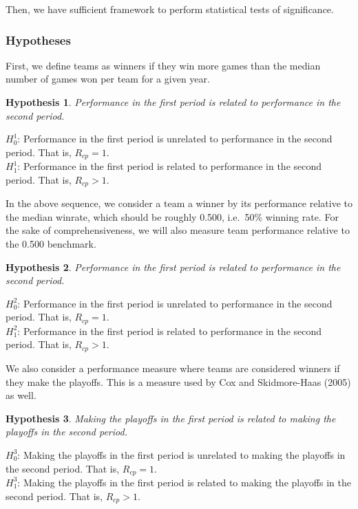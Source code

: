 \documentclass[11pt,]{scrartcl}
\newtheorem{hypothesis}{Hypothesis}
\begin{document}
Then, we have sufficient framework to perform statistical tests of
significance.

\subsubsection{Hypotheses}\label{hypotheses}

First, we define teams as winners if they win more games than the median
number of games won per team for a given year.

\begin{framed}
\begin{hypothesis}
Performance in the first period is related to performance in the second period. 
\end{hypothesis}

\noindent $H_{0}^1$: Performance in the first period is unrelated to performance in the second period. That is, $R_{cp} = 1$. \\ 
$H_{1}^1$: Performance in the first period is related to performance in the second period. That is, $R_{cp} > 1$. 
\end{framed}

In the above sequence, we consider a team a winner by its performance
relative to the median winrate, which should be roughly 0.500, i.e.~50\%
winning rate. For the sake of comprehensiveness, we will also measure
team performance relative to the 0.500 benchmark.

\begin{framed}
\begin{hypothesis}
Performance in the first period is related to performance in the second period.
\end{hypothesis}

\noindent $H_{0}^2$: Performance in the first period is unrelated to performance in the second period. That is, $R_{cp} = 1$.  \\
$H_{1}^2$: Performance in the first period is related to performance in the second period. That is, $R_{cp} > 1$. 
\end{framed}

We also consider a performance measure where teams are considered
winners if they make the playoffs. This is a measure used by Cox and
Skidmore-Haas (2005) as well.

\begin{framed}
\begin{hypothesis}
Making the playoffs in the first period is related to making the playoffs in the second period.
\end{hypothesis}

\noindent $H_{0}^3$: Making the playoffs in the first period is unrelated to making the playoffs in the second period. That is, $R_{cp} = 1$.  \\
$H_{1}^3$: Making the playoffs in the first period is related to making the playoffs in the second period. That is, $R_{cp} > 1$. 
\end{framed}
\end{document}

